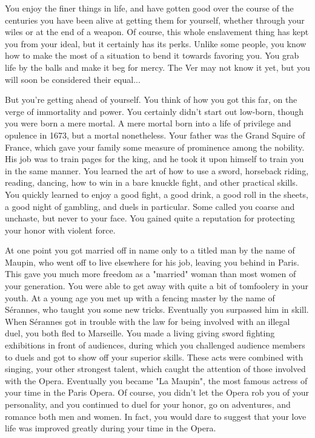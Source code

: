 \documentclass[char]{guildcamp4}
\begin{document}
\name{\cJulie{}}


You enjoy the finer things in life, and have gotten good over the course of the centuries you have been alive at getting them for yourself, whether through your wiles or at the end of a weapon. Of course, this whole enslavement thing has kept you from your ideal, but it certainly has its perks. Unlike some people, you know how to make the most of a situation to bend it towards favoring you. You grab life by the balls and make it beg for mercy. The Ver may not know it yet, but you will soon be considered their equal...

But you're getting ahead of yourself. You think of how you got this far, on the verge of immortality and power. You certainly didn't start out low-born, though you were born a mere mortal. A mere mortal born into a life of privilege and opulence in 1673, but a mortal nonetheless. Your father was the Grand Squire of France, which gave your family some measure of prominence among the nobility. His job was to train pages for the king, and he took it upon himself to train you in the same manner. You learned the art of how to use a sword, horseback riding, reading, dancing, how to win in a bare knuckle fight, and other practical skills. You quickly learned to enjoy a good fight, a good drink, a good roll in the sheets, a good night of gambling, and duels in particular. Some called you coarse and unchaste, but never to your face. You gained quite a reputation for protecting your honor with violent force.

At one point you got married off in name only to a titled man by the name of Maupin, who went off to live elsewhere for his job, leaving you behind in Paris. This gave you much more freedom as a "married" woman than most women of your generation. You were able to get away with quite a bit of tomfoolery in your youth. At a young age you met up with a fencing master by the name of S\'{e}rannes, who taught you some new tricks. Eventually you surpassed him in skill. When S\'{e}rannes got in trouble with the law for being involved with an illegal duel, you both fled to Marseille. You made a living giving sword fighting exhibitions in front of audiences, during which you challenged audience members to duels and got to show off your superior skills. These acts were combined with singing, your other strongest talent, which caught the attention of those involved with the Opera. Eventually you became "La Maupin", the most famous actress of your time in the Paris Opera. Of course, you didn't let the Opera rob you of your personality, and you continued to duel for your honor, go on adventures, and romance both men and women. In fact, you would dare to suggest that your love life was improved greatly during your time in the Opera. 
\end{document}
